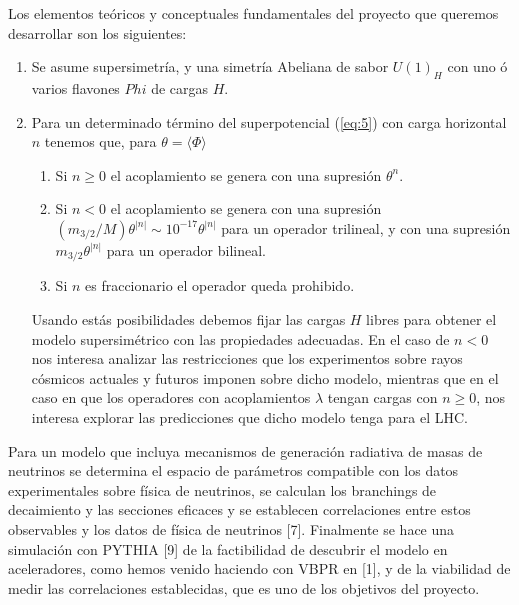 \begin{ideas}
Los elementos teóricos y conceptuales fundamentales del proyecto que queremos desarrollar
son los siguientes:

\begin{enumerate}
\item Se asume supersimetría, y una simetría Abeliana de sabor $U(1)_H$ con uno ó varios flavones $Phi$ de cargas $H$.

\item Para un determinado término del superpotencial (\ref{eq:5}) con carga horizontal $n$ tenemos que, para $\theta=\langle\Phi\rangle$
  \begin{enumerate}
  \item Si $n\ge 0$ el acoplamiento se genera con una supresión $\theta^n$.
  \item Si $n<0$ el acoplamiento se genera con una supresión $(m_{3/2}/M)\theta^{|n|}\sim 10^{-17}\theta^{|n|}$ para un operador trilineal, y con una supresión $m_{3/2}\theta^{|n|}$ para un operador bilineal.
  \item Si $n$ es fraccionario el operador queda prohibido.
  \end{enumerate}
Usando estás posibilidades debemos fijar las cargas $H$ libres para obtener el modelo supersimétrico con las propiedades adecuadas. %
En el caso de $n<0$ nos interesa analizar las restricciones que los experimentos sobre rayos cósmicos actuales y futuros imponen sobre dicho modelo, mientras que en el caso en que los operadores con acoplamientos $\lambda$ tengan cargas con $n\ge 0$, nos interesa explorar las predicciones que dicho modelo tenga para el LHC.
\end{enumerate}

Para un modelo que incluya mecanismos de generación radiativa de masas de neutrinos se determina el espacio de parámetros compatible con los datos experimentales sobre física de neutrinos, se calculan los branchings de decaimiento y las secciones eficaces y se establecen correlaciones entre estos observables y los datos de física de neutrinos [7]. Finalmente se hace una simulación con PYTHIA [9] de la factibilidad de descubrir el modelo en aceleradores, como hemos venido haciendo con VBPR en [1], y de la viabilidad de medir las correlaciones establecidas, que es uno de los objetivos del proyecto.


\end{ideas}

